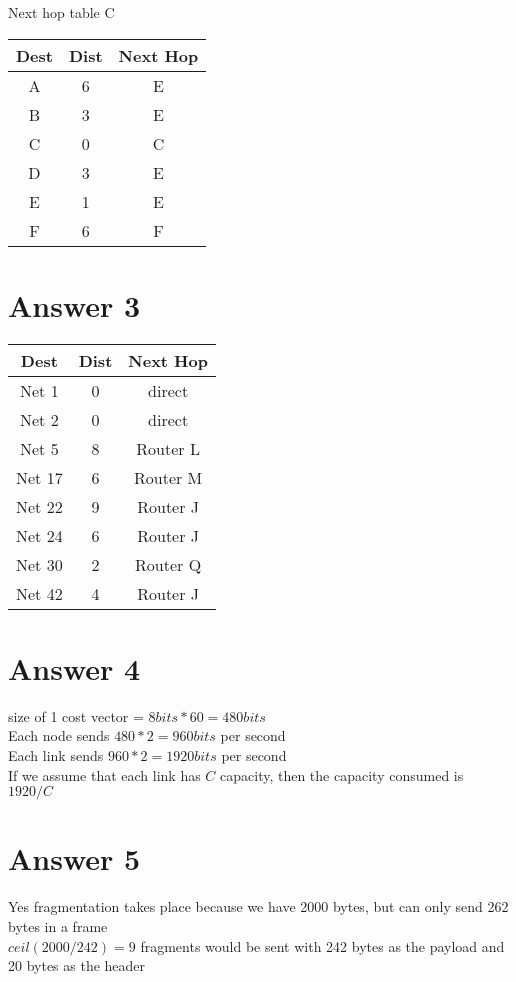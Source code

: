 \documentclass[11pt]{article}
\theoremstyle{definition}
\begin{document}
Next hop table C\\
\begin{tabular}{|c|c|c|}
\hline
Dest & Dist & Next Hop\\
\hline
A & 6 & E\\
B & 3 & E\\
C & 0 & C\\
D & 3 & E\\
E & 1 & E\\
F & 6 & F\\
\hline
\end{tabular}

\section*{Answer 3}
\begin{tabular}{|c|c|c|}\hline
Dest & Dist & Next Hop\\
\hline
Net 1 & 0 & direct\\
Net 2 & 0 & direct\\
Net 5 & 8 & Router L\\
Net 17 & 6 & Router M\\
Net 22 & 9 & Router J\\
Net 24 & 6 & Router J\\
Net 30 & 2 & Router Q\\
Net 42 & 4 & Router J\\
\hline
\end{tabular}

\section*{Answer 4}
size of 1 cost vector = $8 bits * 60 = 480bits$\\
Each node sends $480 * 2 = 960bits$ per second\\
Each link sends $960 * 2 = 1920bits$ per second\\
If we assume that each link has $C$ capacity, then the capacity consumed is $1920/C$

\section*{Answer 5}
Yes fragmentation takes place because we have 2000 bytes, but can only send 262 bytes in a frame\\
$ceil(2000/242) = 9$ fragments would be sent with 242 bytes as the payload and 20 bytes as the header\\ 
\end{document}
